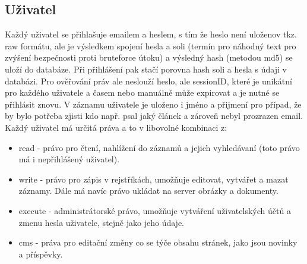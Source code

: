 \subsection{Uživatel}
Každý uživatel se přihlašuje emailem a heslem, s tím že heslo není uloženov tkz. raw formátu, ale
je výsledkem spojení hesla a soli (termín pro náhodný text pro zvýšení bezpečnosti proti bruteforce útoku) a
výsledný hash (metodou md5) se uloží do databáze. Při přihlášení pak stačí porovna hash soli a hesla s údaji v databázi.
Pro ověřování práv ale neslouží heslo, ale sessionID, které je unikátní pro každého uživatele a časem nebo
manuálně může expirovat a je nutné se přihlásit znovu. V záznamu uživatele je uloženo i jméno a přijmení pro případ, že
by bylo potřeba zjisti kdo např. psal jaký článek a zároveň nebyl prozrazen email. Každý uživatel má určitá práva a to v libovolné kombinaci z:
\begin{itemize}
     \item read - právo pro čtení, nahlížení do záznamů a jejich vyhledávaní (toto právo má i nepřihlášený uživatel).
     \item write - právo pro zápis v rejstříkách, umožňuje editovat, vytvářet a mazat záznamy. Dále má navíc právo ukládat na server obrázky a dokumenty.
     \item execute - administrátorské právo, umožňuje vytváření uživatelských účtů a zmenu hesla uživatele, stejně jako jeho údaje.
     \item cms - práva pro editační změny co se týče obsahu stránek, jako jsou novinky a příspěvky.
\end{itemize}
